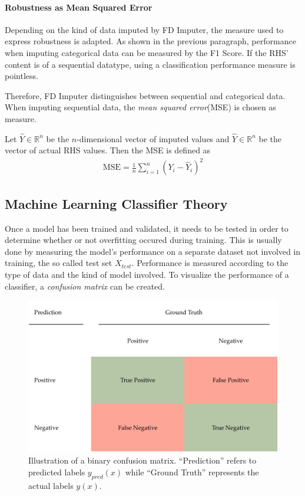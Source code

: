 \paragraph{Robustness as Mean Squared Error}
Depending on the kind of data imputed by FD Imputer, the measure used to express robustness is adapted.
As shown in the previous paragraph, performance when imputing categorical data can be measured by the F1 Score.
If the RHS' content is of a sequential datatype, using a classification performance measure is pointless.

Therefore, FD Imputer distinguishes between sequential and categorical data.
When imputing sequential data, the \emph{mean squared error}(MSE) is chosen as measure.

Let \( \hat{Y} \in \mathbb{R}^{n}\) be the \( n \)-dimensional vector of imputed values and \( \hat{Y} \in \mathbb{R}^{n} \) be the vector of actual RHS values. Then the MSE is defined as
\begin{align}
\text{MSE} = \frac{1}{n}\sum_{i=1}^{n} \left(Y_i - \hat{Y}_i\right)^2
\end{align}

\newpage

\subsection{Machine Learning Classifier Theory}
Once a model has been trained and validated, it needs to be tested in order to determine whether or not overfitting occured during training.
This is usually done by measuring the model's performance on a separate dataset not involved in training, the so called test set \( X_{test} \).
Performance is measured according to the type of data and the kind of model involved.
To visualize the performance of a classifier, a \emph{confusion matrix} can be created.
\begin{figure}[ht]
     \centering
     \includegraphics[width=\textwidth]{images/binary-confusion-matrix.pdf}
     \caption{Illustration of a binary confusion matrix.
     ``Prediction'' refers to predicted labels \(y_{pred}(x)\) while ``Ground Truth'' represents the actual labels \(y(x)\).}
     \label{fig:confusion-matrix}
 \end{figure}

